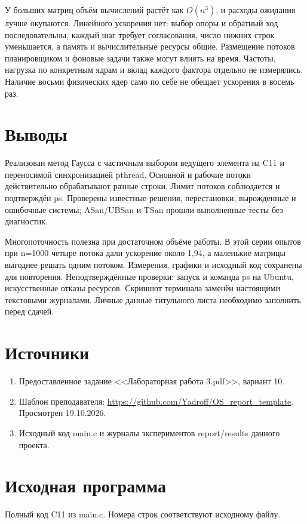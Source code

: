 У больших матриц объём вычислений растёт как $O(n^3)$, и расходы ожидания
лучше окупаются. Линейного ускорения нет: выбор опоры и обратный ход
последовательны, каждый шаг требует согласования, число нижних строк
уменьшается, а память и вычислительные ресурсы общие. Размещение потоков
планировщиком и фоновые задачи также могут влиять на время. Частоты, нагрузка
по конкретным ядрам и вклад каждого фактора отдельно не измерялись.
Наличие восьми физических ядер само по себе не обещает ускорения в восемь раз.

\section{Выводы}
Реализован метод Гаусса с частичным выбором ведущего элемента на C11
и переносимой синхронизацией pthread. Основной и рабочие потоки действительно
обрабатывают разные строки. Лимит потоков соблюдается и подтверждён ps.
Проверены известные решения, перестановки, вырожденные и ошибочные системы;
ASan/UBSan и TSan прошли выполненные тесты без диагностик.

Многопоточность полезна при достаточном объёме работы. В этой серии опытов
при n=1000 четыре потока дали ускорение около 1,94, а маленькие матрицы
выгоднее решать одним потоком. Измерения, графики и исходный код сохранены
для повторения. Неподтверждённые проверки: запуск и команда ps на Ubuntu,
искусственные отказы ресурсов. Скриншот терминала
заменён настоящими текстовыми журналами. Личные данные титульного листа
необходимо заполнить перед сдачей.

\section{Источники}
\begin{enumerate}[nosep]
\item Предоставленное задание <<Лабораторная работа 3.pdf>>, вариант 10.
\item Шаблон преподавателя:
\url{https://github.com/Yadroff/OS_report_template}. Просмотрен 19.10.2026.
\item Исходный код main.c и журналы экспериментов report/results данного проекта.
\end{enumerate}

\clearpage
\section{Исходная программа}
Полный код C11 из main.c. Номера строк соответствуют исходному файлу.

